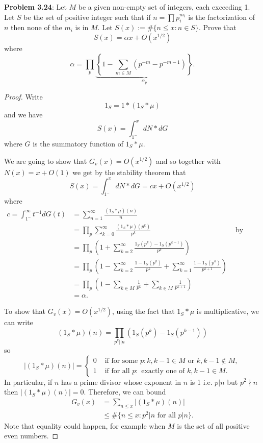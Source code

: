 \documentclass[12pt]{article}
\newcommand{\Abs}[1]{\left| #1 \right|}
\begin{document}
\fi

\textbf{Problem 3.24}: Let $M$ be a given non-empty set of integers, each exceeding 1. Let $S$ be the set of positive integer such that if $n = \prod p_i^{m_i}$ is the factorization of $n$ then none of the $m_i$ is in $M$. Let $S(x) := \#\{n \leq x : n \in S\}$. Prove that
$$S(x) = \alpha x + O(x^{1/2})$$
where
$$\alpha = \prod_p \underbrace{\left\{1 - \sum_{m \in M} (p^{-m} - p^{-m-1})\right\}}_{\alpha_p}.$$

\begin{proof}
Write
$$1_S = 1 * (1_S * \mu)$$
and we have
$$S(x) = \int_{1^-}^x dN * dG$$
where $G$ is the summatory function of $1_S * \mu$.

We are going to show that $G_v(x) = O(x^{1/2})$ and so together with $N(x) = x + O(1)$ we get by the stability theorem that
$$S(x) = \int_{1^-}^x dN * dG = c x + O(x^{1/2})$$
where
\begin{align*}
c = \int_{1^-}^\infty t^{-1} dG(t) &= \sum_{n = 1}^{\infty} \frac{(1_S * \mu)(n)}{n}\\
&= \prod_p \sum_{k = 0}^{\infty} \frac{(1_S * \mu)(p^k)}{p^k} &\text{ by multiplicativity}\\
&= \prod_p \left(1 + \sum_{k = 2}^{\infty} \frac{1_S(p^k) - 1_S(p^{k-1})}{p^k}\right)\\
&= \prod_p \left(1 - \sum_{k = 2}^{\infty} \frac{1 - 1_S(p^k)}{p^k} + \sum_{k = 1}^{\infty} \frac{1 - 1_S(p^k)}{p^{k+1}}\right)\\
&= \prod_p \left(1 - \sum_{k \in M} \frac{1}{p^k} + \sum_{k \in M} \frac{1}{p^{k+1}}\right)\\
&= \alpha.
\end{align*}

To show that $G_v(x) = O(x^{1/2})$, using the fact that $1_S * \mu$ is multiplicative, we can write
$$(1_S * \mu)(n) =  \prod_{p^k || n} (1_S(p^k) - 1_S(p^{k-1}))$$
so
$$\Abs{(1_S * \mu)(n)} = \begin{cases}
0 &\text{ if for some }p:  k, k - 1 \in M \text{ or } k, k - 1 \not\in M,\\
1 &\text{ if for all }p: \text{ exactly one of } k, k - 1 \in M.
\end{cases}$$
In particular, if $n$ has a prime divisor whose exponent in $n$ is 1 i.e. $p | n$ but $p^2 \nmid n$ then $\Abs{(1_S * \mu)(n)} = 0$. Therefore, we can bound
\begin{align*}
G_v(x) &= \sum_{n \leq x} \Abs{(1_S * \mu)(n)}\\
&\leq \#\{n \leq x : p^2 | n \text{ for all } p | n\}.
\end{align*}
Note that equality could happen, for example when $M$ is the set of all positive even numbers.


\end{proof}
\end{document}
